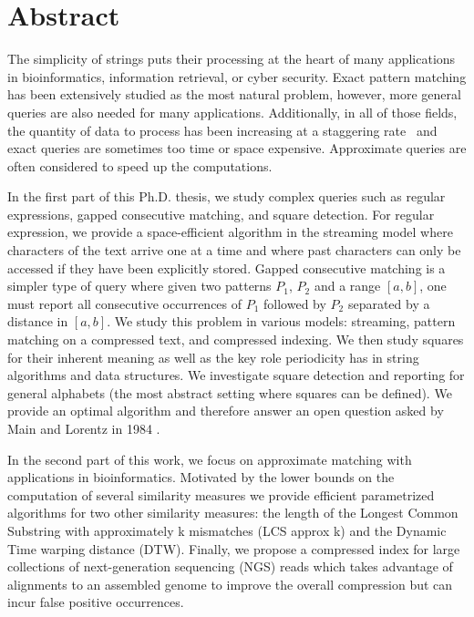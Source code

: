 \chapter*{Abstract}

The simplicity of strings puts their processing at the heart of many applications in bioinformatics, information retrieval, or cyber security. Exact pattern matching has been extensively studied \cite{} as the most natural problem, however, more general queries are also needed for many applications\cite{}. Additionally, in all of those fields, the quantity of data to process has been increasing at a staggering rate~\cite{muir2016real} and exact queries are sometimes too time or space expensive. Approximate queries are often considered to speed up the computations.

In the first part of this Ph.D. thesis, we study complex queries such as regular expressions, gapped consecutive matching, and square detection. 
For regular expression, we provide a space-efficient algorithm in the streaming model where characters of the text arrive one at a time and where past characters can only be accessed if they have been explicitly stored. 
Gapped consecutive matching is a simpler type of query where given two patterns $P_1$, $P_2$ and a range $[a,b]$, one must report all consecutive occurrences of $P_1$ followed by $P_2$ separated by a distance in $[a,b]$. We study this problem in various models: streaming, pattern matching on a compressed text, and compressed indexing.
We then study squares for their inherent meaning \cite{} as well as the key role periodicity has in string algorithms and data structures. We investigate square detection and reporting for general alphabets (the most abstract setting where squares can be defined). We provide an optimal algorithm and therefore answer an open question asked by Main and Lorentz in 1984 \cite{}.

In the second part of this work, we focus on approximate matching with applications in bioinformatics.
Motivated by the lower bounds on the computation of several similarity measures we provide efficient parametrized algorithms for two other similarity measures: the length of the Longest Common Substring with approximately k mismatches (LCS approx k) and the Dynamic Time warping distance (DTW).
Finally, we propose a compressed index for large collections of next-generation sequencing (NGS) reads which takes advantage of alignments to an assembled genome to improve the overall compression but can incur false positive occurrences.


